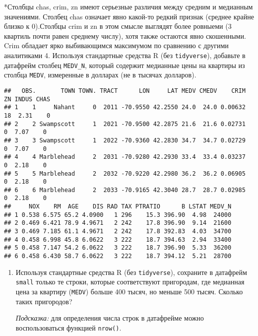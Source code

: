 \documentclass[
]{article}
\newenvironment{Shaded}{\begin{snugshade}}{\end{snugshade}}
\newcommand{\DecValTok}[1]{\textcolor[rgb]{0.00,0.00,0.81}{#1}}
\newcommand{\FunctionTok}[1]{\textcolor[rgb]{0.00,0.00,0.00}{#1}}
\newcommand{\NormalTok}[1]{#1}
\newcommand{\OtherTok}[1]{\textcolor[rgb]{0.56,0.35,0.01}{#1}}
\newcommand{\SpecialCharTok}[1]{\textcolor[rgb]{0.00,0.00,0.00}{#1}}
\begin{document}
*Столбцы chas, crim, zn имеют серьезные различия между средним и
медианным значениями. Столбец chas означает явно какой-то редкий признак
(среднее крайне близко к 0).Столбцы crim и zn в этом смысле выглядят
более ровныеми (3 квартиль почти равен среднему числу), хотя также
остаются явно скошенными. Crim обладает ярко выбивающимся максимумом по
сравнению с другими аналитиками 4. Используя стандартные средства R (без
\texttt{tidyverse}), добавьте в датафрейм столбец \texttt{MEDV\_N},
который содержит медианные цены на квартиры из столбца \texttt{MEDV},
измеренные в долларах (не в тысячах долларов).

\begin{Shaded}
\end{Shaded}

\begin{verbatim}
##   OBS.       TOWN TOWN. TRACT      LON     LAT MEDV CMEDV    CRIM ZN INDUS CHAS
## 1    1     Nahant     0  2011 -70.9550 42.2550 24.0  24.0 0.00632 18  2.31    0
## 2    2 Swampscott     1  2021 -70.9500 42.2875 21.6  21.6 0.02731  0  7.07    0
## 3    3 Swampscott     1  2022 -70.9360 42.2830 34.7  34.7 0.02729  0  7.07    0
## 4    4 Marblehead     2  2031 -70.9280 42.2930 33.4  33.4 0.03237  0  2.18    0
## 5    5 Marblehead     2  2032 -70.9220 42.2980 36.2  36.2 0.06905  0  2.18    0
## 6    6 Marblehead     2  2033 -70.9165 42.3040 28.7  28.7 0.02985  0  2.18    0
##     NOX    RM  AGE    DIS RAD TAX PTRATIO      B LSTAT MEDV_N
## 1 0.538 6.575 65.2 4.0900   1 296    15.3 396.90  4.98  24000
## 2 0.469 6.421 78.9 4.9671   2 242    17.8 396.90  9.14  21600
## 3 0.469 7.185 61.1 4.9671   2 242    17.8 392.83  4.03  34700
## 4 0.458 6.998 45.8 6.0622   3 222    18.7 394.63  2.94  33400
## 5 0.458 7.147 54.2 6.0622   3 222    18.7 396.90  5.33  36200
## 6 0.458 6.430 58.7 6.0622   3 222    18.7 394.12  5.21  28700
\end{verbatim}

\begin{enumerate}
\def\labelenumi{\arabic{enumi}.}
\setcounter{enumi}{4}
\item
  Используя стандартные средства R (без \texttt{tidyverse}), сохраните в
  датафрейм \texttt{small} только те строки, которые соответствуют
  пригородам, где медианная цена за квартиру (\texttt{MEDV}) больше 400
  тысяч, но меньше 500 тысяч. Сколько таких пригородов?

  \emph{Подсказка:} для определения числа строк в датафрейме можно
  воспользоваться функцией \texttt{nrow()}.
\end{enumerate}
\end{document}
